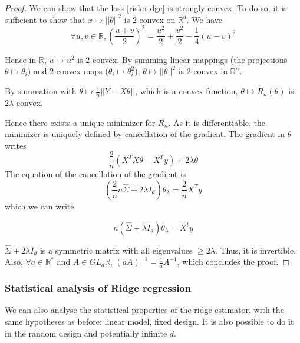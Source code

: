 \documentclass[
10pt, %
a4paper, %
oneside, %
headinclude,footinclude, %
BCOR5mm, %
]{scrartcl}
\begin{document}
\begin{proof}
We can show that the loss \ref{risk:ridge} is strongly convex. To do so, it is sufficient to show that $x\mapsto ||\theta||^2$ is $2$-convex on $ \mathbb{R}^d$. We have
\begin{equation*}
    \forall u, v\in \mathbb{R}, ( \frac{u+v}{2} )^2= \frac{u^2}{2} + \frac{v^2}{2} - \frac{1}{4} (u-v)^2
\end{equation*}

    Hence in $\mathbb{R} $, $ u\mapsto u^2$ is $2$-convex. By summing linear mappings (the projections $\theta\mapsto \theta_i$) and $2$-convex maps ($\theta_i\mapsto \theta_i^2$), $\theta\mapsto ||\theta||^2$ is $2$-convex in $ \mathbb{R}^n$.

    By summation with $ \theta \mapsto \frac{1}{n} ||Y-X\theta||$, which is a convex function,  $\theta \mapsto \tilde{R}_n(\theta)$ is $2\lambda$-convex.

    Hence there exists a unique minimizer for $R_n$. As it is differentiable, the minimizer is uniquely defined by cancellation of the gradient. The gradient in $\theta$ writes
    \begin{equation*}
	\frac{2}{n} (X^TX\theta - X^Ty)+2\lambda \theta
    \end{equation*}
    The equation of the cancellation of the gradient is
    \begin{equation*}
	(\frac{2}{n} n \hat{\Sigma} + 2\lambda I_d)\theta_{\lambda} = \frac{2}{n} X^Ty
    \end{equation*}
    which we can write

    \begin{equation*}
	n(\hat{\Sigma}+\lambda I_d)\theta_{\lambda} = X^ty
    \end{equation*}

    $ \hat{\Sigma}+2\lambda I_d$ is a symmetric matrix with all eigenvalues $\geq 2\lambda$. Thus, it is invertible. Also, $\forall a\in \mathbb{R}^* $ and $ A\in GL_d\mathbb{R} $, $(aA)^{-1} = \frac{1}{a} A^{-1}$, which concludes the proof.
\end{proof}
    
\subsubsection{\large\color{Periwinkle}Statistical analysis of Ridge regression}

We can also analyse the statistical properties of the ridge estimator, with the same hypotheses as before: linear model, fixed design. It is also possible to do it in the random design and potentially infinite $d$.
\end{document}

